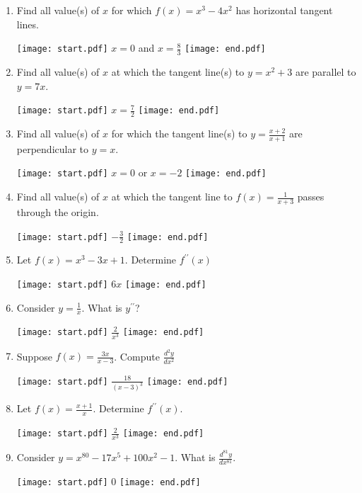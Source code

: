 \documentclass[12pt]{article}
\begin{document}
\begin{enumerate}
\item Find all value(s) of $x$ for which $f(x)=x^3-4x^2$ has horizontal tangent lines.

\texttt{[image: start.pdf]}
{{$x=0$ and $\displaystyle x=\frac{8}{3}$}}
\texttt{[image: end.pdf]}


\item Find all value(s) of $x$ at which the tangent line(s) to $y=x^2+3$ are parallel to $y=7x$.

\texttt{[image: start.pdf]}
{{$\displaystyle x=\frac{7}{2}$}}
\texttt{[image: end.pdf]}


\item Find all value(s) of $x$ for which the tangent line(s) to $\displaystyle y=\frac{x+2}{x+1}$ are perpendicular to $y=x$.

\texttt{[image: start.pdf]}
{{$x=0$ or $x=-2$}}
\texttt{[image: end.pdf]}


\item Find all value(s) of $x$ at which the tangent line to $\displaystyle f(x)=\frac{1}{x+3}$ passes through the origin.

\texttt{[image: start.pdf]}
{{$\displaystyle -\frac{3}{2}$}}
\texttt{[image: end.pdf]}


\item Let $f(x)=x^3-3x+1$.  Determine $f^{\prime \prime}(x)$

\texttt{[image: start.pdf]}
{{$6x$}}
\texttt{[image: end.pdf]}


\item Consider $\displaystyle y=\frac{1}{x}$.  What is $y^{\prime \prime}$?

\texttt{[image: start.pdf]}
{{$\displaystyle \frac{2}{x^3}$}}
\texttt{[image: end.pdf]}
 

\item Suppose $\displaystyle f(x)=\frac{3x}{x-3}$.  Compute $\displaystyle \frac{d^2y}{dx^2}$

\texttt{[image: start.pdf]}
{{$\displaystyle \frac{18}{(x-3)^3}$}}
\texttt{[image: end.pdf]}


\item Let $\displaystyle f(x)=\frac{x+1}{x}$.  Determine $f^{\prime \prime}(x)$.

\texttt{[image: start.pdf]}
{{$\displaystyle \frac{2}{x^3}$}}
\texttt{[image: end.pdf]}
 

\item Consider $y=x^{80}-17x^5+100x^2-1$.  What is $\displaystyle \frac{d^{81}y}{dx^{81}}$.

\texttt{[image: start.pdf]}
{{0}}
\texttt{[image: end.pdf]}
 


\end{enumerate}
\end{document}
